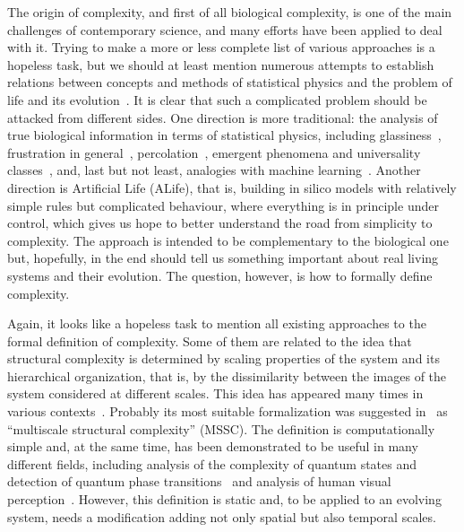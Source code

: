 \documentclass[
  11pt,
]{article}
\begin{document}
The origin of complexity, and first of all biological complexity,
is one of the main challenges of contemporary science, and
many efforts have been applied to deal with it. Trying to make
a more or less complete list of various approaches is a hopeless
task, but we should at least mention numerous attempts to
establish relations between concepts and methods of statistical
physics and the problem of life and its evolution~\cite{laughlin1,laughlin2,gavrilets2004,smith2008thermo,goldenfeld2011life,katsnelson2018towards,wolf2018physical,vanchurin2022toward,vanchurin2022thermo}. It is clear that such a
complicated problem should be attacked from different sides.
One direction is more traditional: the analysis of true biological information
in terms of statistical physics, including glassiness~\cite{laughlin1,laughlin2}, frustration in general~\cite{wolf2018physical,katsnelson2018towards}, percolation~\cite{gavrilets2004,katsnelson2018towards},
emergent phenomena and universality classes~\cite{goldenfeld2011life}, and, last but not
least, analogies with machine learning~\cite{vanchurin2022thermo}. Another direction is
Artificial Life (ALife), that is, building in silico models with relatively simple
rules but complicated behaviour, where everything is in principle under control, which
gives us hope to better understand the road from simplicity to complexity. The approach
is intended to be complementary to the biological one but, hopefully, in the end should
tell us something important about real living systems and their evolution. The question,
however, is how to formally define complexity.

Again, it looks like a hopeless task to mention all existing approaches to
the formal definition of complexity. Some of them are related to the
idea that structural complexity is determined by scaling properties of the
system and its hierarchical organization, that is, by the dissimilarity between
the images of the system considered at different scales. This idea has appeared
many times in various contexts~\cite{wolpert2007,lindeberg2008,broido2019}.
Probably its most suitable formalization was suggested in~\cite{bagrov2020multiscale}
as ``multiscale structural complexity'' (MSSC). The definition is computationally
simple and, at the same time, has been demonstrated to be useful in many different
fields, including analysis of the complexity of quantum states and detection of
quantum phase transitions~\cite{sotnikov2022} and analysis of human visual
perception~\cite{kravchenko2026}. However, this definition is static and,
to be applied to an evolving system, needs a modification adding not only
spatial but also temporal scales.
\end{document}
